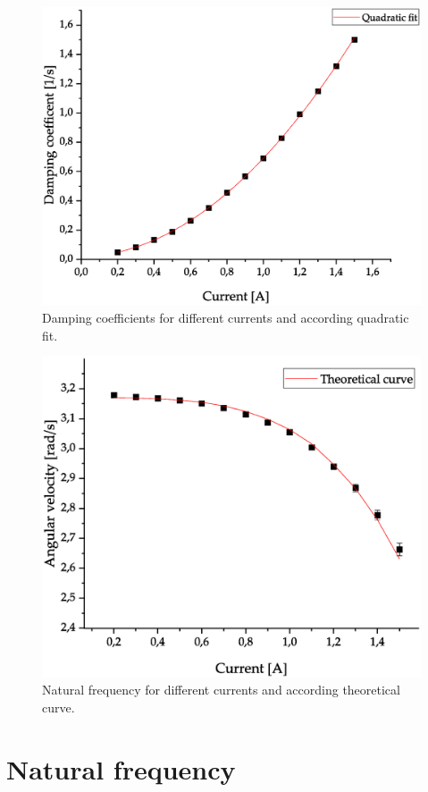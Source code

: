 \documentclass{article}
\begin{document}
\nopagebreak
\begin{figure}[H]
\centering
\includegraphics[width=320pt]{damping.eps}
\caption{Damping coefficients for different currents and according quadratic fit.}
\label{fig:length_eight_mouse}
\end{figure}
\begin{figure}[H]
\centering
\includegraphics[width=320pt]{frequency.eps}
\caption{Natural frequency for different currents and according theoretical curve.}
\label{fig:length_eight_mouse}
\end{figure}
\section{Natural frequency}
\end{document}

